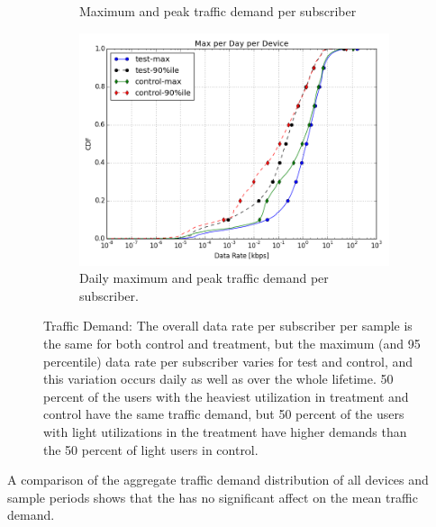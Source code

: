\begin{figure}[ht]
\begin{minipage}{1\linewidth}
\begin{subfigure}[b]{0.33\linewidth}
               \caption{Maximum and peak traffic demand per 
subscriber\label{fig:CDF-data-rate-max}}
\end{subfigure}
%
\begin{subfigure}[b]{0.33\linewidth}
\includegraphics[width=\linewidth]{figures/cdf-max-per-day-per-device.png}
               \caption{Daily maximum and peak 
traffic demand per subscriber.\label{fig:CDF-data-rate-max-daily}}
\end{subfigure}
%
\end{minipage}
\caption{Traffic Demand: The overall data rate per subscriber per sample is the 
same for both control and treatment, but the maximum (and 95 percentile) data 
rate per subscriber varies for test and control, and this variation occurs 
daily as well as over the whole lifetime. 50 percent of the users with the 
heaviest utilization in treatment and control have the same traffic demand, 
but 50 percent of the users with light utilizations in the treatment have 
higher demands than the 50 percent of light users in control.}
\label{fig:traffic-demand}
\end{figure}


A comparison of the aggregate traffic demand distribution of all devices 
and sample periods shows that the \treatment{} has no significant affect on the 
mean traffic demand. 
